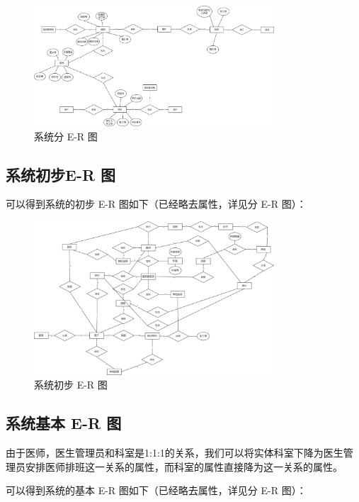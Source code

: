 \documentclass{article}
\begin{document}
\begin{figure}[H]
    \centering
    \includegraphics[width=0.8\textwidth]{images/dividedER5.png}
    \caption{系统分 E-R 图}
\end{figure}

\subsection{系统初步E-R 图}

可以得到系统的初步 E-R 图如下（已经略去属性，详见分 E-R 图）：

\begin{figure}[H]
    \centering
    \includegraphics[width=0.8\textwidth]{images/initER.png}
    \caption{系统初步 E-R 图}
\end{figure}

\subsection{系统基本 E-R 图}

由于医师，医生管理员和科室是1:1:1的关系，我们可以将实体科室下降为医生管理员安排医师排班这一关系的属性，而科室的属性直接降为这一关系的属性。

可以得到系统的基本 E-R 图如下（已经略去属性，详见分 E-R 图）：
\end{document}
